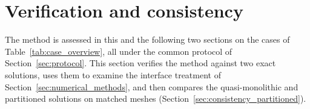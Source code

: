 \section{Verification and consistency}\label{sec:verification_exact}

The method is assessed in this and the following two sections on the cases of Table~\ref{tab:case_overview}, all under the common protocol of Section~\ref{sec:protocol}.
This section verifies the method against two exact solutions, uses them to examine the interface treatment of Section~\ref{sec:numerical_methods}, and then compares the quasi-monolithic and partitioned solutions on matched meshes (Section~\ref{sec:consistency_partitioned}).

